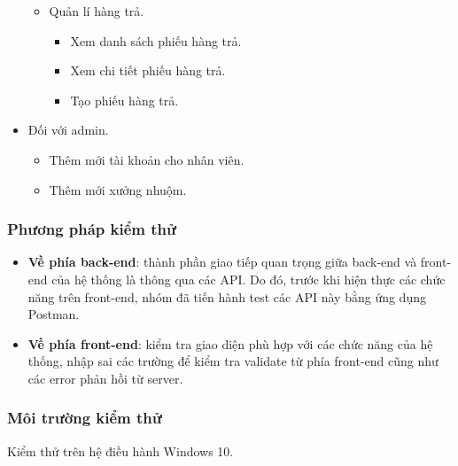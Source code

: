 \begin{itemize}
\begin{itemize}
        \item Quản lí hàng trả.
        \begin{itemize}
            \item Xem danh sách phiếu hàng trả.
            \item Xem chi tiết phiếu hàng trả.
            \item Tạo phiếu hàng trả.
        \end{itemize}
    \end{itemize}
    \item Đối với admin.
    \begin{itemize}
        \item Thêm mới tài khoản cho nhân viên.
        \item Thêm mới xưởng nhuộm.
    \end{itemize}
\end{itemize}

\subsubsection{Phương pháp kiểm thử}
\begin{itemize}
    \item \textbf{Về phía back-end}: thành phần giao tiếp quan trọng giữa back-end và front-end của hệ thống là thông qua các API. Do đó, trước khi hiện thực các chức năng trên front-end, nhóm đã tiến hành test các API này bằng ứng dụng Postman.
    \item \textbf{Về phía front-end}: kiểm tra giao diện phù hợp với các chức năng của hệ thống, nhập sai các trường để kiểm tra validate từ phía front-end cũng như các error phản hồi từ server.
\end{itemize}

\subsubsection{Môi trường kiểm thử}
Kiểm thử trên hệ điều hành Windows 10.